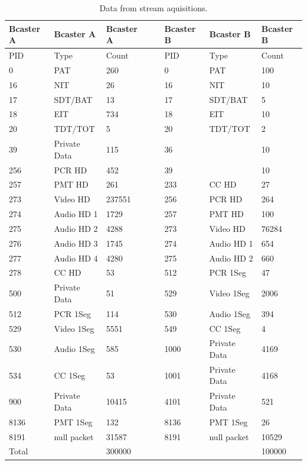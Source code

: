\documentclass[12pt,a4paper]{article}
\begin{document}
\begin{table}[b]
\centering
    \caption {Data from stream aquisitions.}
    \begin{tabular}{|l|l|l|l|l|l|l|}
    \hline
     Bcaster A  & Bcaster A          & Bcaster A    & ~ & Bcaster B & Bcaster B         & Bcaster B   \\ \hline
    PID   & Type         & Count  & ~ & PID  & Type         & Count  \\ \hline
    0     & PAT          & 260    & ~ & 0    & PAT          & 100    \\ \hline
    16    & NIT          & 26     & ~ & 16   & NIT          & 10     \\ \hline
    17    & SDT/BAT      & 13     & ~ & 17   & SDT/BAT      & 5      \\ \hline
    18    & EIT          & 734    & ~ & 18   & EIT          & 10     \\ \hline
    20    & TDT/TOT      & 5      & ~ & 20   & TDT/TOT      & 2      \\ \hline
    39    & Private Data & 115    & ~ & 36   & ~            & 10     \\ \hline
    256   & PCR HD       & 452    & ~ & 39   & ~            & 10     \\ \hline
    257   & PMT HD       & 261    & ~ & 233  & CC HD        & 27     \\ \hline
    273   & Video HD     & 237551 & ~ & 256  & PCR HD       & 264    \\ \hline
    274   & Audio HD 1   & 1729   & ~ & 257  & PMT HD       & 100    \\ \hline
    275   & Audio HD 2   & 4288   & ~ & 273  & Video HD     & 76284  \\ \hline
    276   & Audio HD 3   & 1745   & ~ & 274  & Audio HD 1   & 654    \\ \hline
    277   & Audio HD 4   & 4280   & ~ & 275  & Audio HD 2   & 660    \\ \hline
    278   & CC HD        & 53     & ~ & 512  & PCR 1Seg     & 47     \\ \hline
    500   & Private Data & 51     & ~ & 529  & Video 1Seg   & 2006   \\ \hline
    512   & PCR 1Seg     & 114    & ~ & 530  & Audio 1Seg   & 394    \\ \hline
    529   & Video 1Seg   & 5551   & ~ & 549  & CC 1Seg      & 4      \\ \hline
    530   & Audio 1Seg   & 585    & ~ & 1000 & Private Data & 4169   \\ \hline
    534   & CC 1Seg      & 53     & ~ & 1001 & Private Data & 4168   \\ \hline
    900   & Private Data & 10415  & ~ & 4101 & Private Data & 521    \\ \hline
    8136  & PMT 1Seg     & 132    & ~ & 8136 & PMT 1Seg     & 26     \\ \hline
    8191  & null packet  & 31587  & ~ & 8191 & null packet  & 10529  \\ \hline
    Total & ~            & 300000 & ~ & ~    & ~            & 100000 \\ \hline
    \end{tabular}
	\label{tab_dumps}
\end{table}
\end{document}
